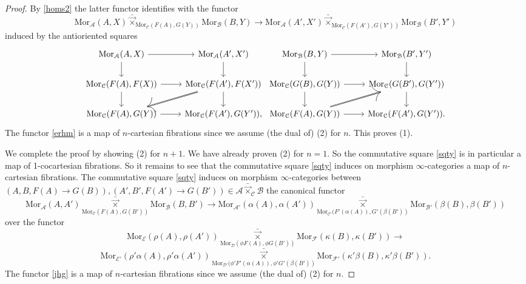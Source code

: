 \documentclass[10pt,oneside]{article}
\numberwithin{equation}{section} %
\numberwithin{figure}{section} %
\theoremstyle{plain}
\theoremstyle{definition}
\newcommand{\mA}{{\mathcal A}}
\newcommand{\mB}{{\mathcal B}}
\newcommand{\mC}{{\mathcal C}}
\newcommand{\mD}{{\mathcal D}}
\newcommand{\mE}{{\mathcal E}}
\newcommand{\mF}{{\mathcal F}}
\newcommand{\Mor}{{\mathrm{Mor}}}
\begin{document}
\begin{proof}
By \cref{homs2} the latter functor identifies with the functor
\begin{equation}\label{erhm}
\Mor_\mA(A,X) {\bar{\vec{\times}}}_{\Mor_\mC(F(A), G(Y))} \Mor_\mB(B,Y)
\to \Mor_\mA(A',X') {\bar{\vec{\times}}}_{\Mor_\mC(F(A'), G(Y'))} \Mor_\mB(B',Y') \end{equation}
induced by the antioriented squares
\begin{equation*}
\begin{tikzcd}
\Mor_\mA(A,X) \ar{r}{} \ar{d}[swap]{} & \Mor_\mA(A',X'){} \ar{d}{} \\
\Mor_\mC(F(A), F(X))  \ar{r}[swap]{} \ar{d}{} & \Mor_\mC(F(A'), F(X')) \ar{d}{}  \ar[double]{dl}
\\
\Mor_\mC(F(A), G(Y))  \ar{r}[swap]{} & \Mor_\mC(F(A'), G(Y')),
\end{tikzcd}
\begin{tikzcd}
\Mor_\mB(B,Y) \ar{r}{} \ar{d}[swap]{} & \Mor_\mB(B',Y') {} \ar{d}{} \\
\Mor_\mC(G(B), G(Y)) \ar{d}{} \ar{r}[swap]{} & \Mor_\mC(G(B'), G(Y')) \ar{d}{}
\\
\Mor_\mC(F(A), G(Y))  \ar[double]{ur} \ar{r}[swap]{} & \Mor_\mC(F(A'), G(Y')).
\end{tikzcd}
\end{equation*}
The functor \ref{erhm} is a map of $n$-cartesian fibrations since we assume (the dual of) (2) for $n$.
This proves (1).

We complete the proof by showing (2) for $n+1.$
We have already proven (2) for $n=1.$
So the commutative square \ref{sqty}
is in particular a map of 1-cocartesian fibrations.
So it remains to see that the commutative square \ref{sqty}
induces on morphism $\infty$-categories a map of $n$-cartesian fibrations.
The commutative square \ref{sqty} induces on morphism $\infty$-categories between $(A, B, F(A) \to G(B)), (A', B', F(A') \to G(B')) \in \mA {\bar{\vec{\times}}}_{\mC} \mB$ the canonical functor
\begin{equation}\label{jhg}
\Mor_\mA(A,A')\!\!\!\!\!\underset{\Mor_\mC(F(A),G(B'))}{{\bar{\vec{\times}}}} \Mor_\mB(B,B') \to \Mor_{\mA'}(\alpha(A),\alpha(A'))\!\!\!\!\!\underset{\Mor_{\mC'}(F'(\alpha(A)),G'(\beta(B'))}{{\bar{\vec{\times}}}} \!\!\!\!\!\Mor_{\mB'}(\beta(B),\beta(B')) 
\end{equation}
over the functor 
$$
\Mor_\mE(\rho(A),\rho(A'))\!\!\!\!\!\underset{\Mor_\mD(\phi F(A),\phi G(B'))}{{\bar{\vec{\times}}}} \!\!\!\!\!\Mor_\mF(\kappa(B),\kappa(B')) \to $$$$ \Mor_{\mE'}(\rho'\alpha(A),\rho'\alpha(A'))\!\!\!\!\!\underset{\Mor_{\mD'}(\phi' F'(\alpha(A)),\phi' G'(\beta(B'))}{{\bar{\vec{\times}}}} \!\!\!\!\!\Mor_{\mF'}(\kappa'\beta(B),\kappa'\beta(B')). 
$$ 
The functor \ref{jhg} is a map of $n$-cartesian fibrations since we assume (the dual of) (2) for $n.$
\end{proof}
\end{document}
